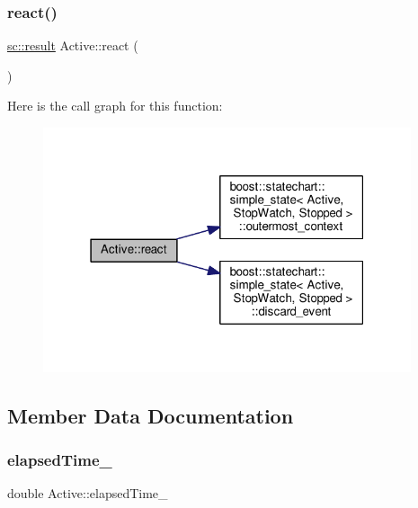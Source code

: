 \subsubsection{\texorpdfstring{react()}{react()}\hspace{0.1cm}{\footnotesize\ttfamily [2/2]}}
{\footnotesize\ttfamily \mbox{\hyperlink{namespaceboost_1_1statechart_abe807f6598b614d6d87bb951ecd92331}{sc\+::result}} Active\+::react (\begin{DoxyParamCaption}\item[{const \mbox{\hyperlink{struct_ev_leaf_deferred}{Ev\+Leaf\+Deferred}} \&}]{ }\end{DoxyParamCaption})\hspace{0.3cm}{\ttfamily [inline]}}

Here is the call graph for this function\+:
\nopagebreak
\begin{figure}[H]
\begin{center}
\leavevmode
\includegraphics[width=307pt]{struct_active_a173c792f4e486c497ad10ebc5add135e_cgraph}
\end{center}
\end{figure}


\subsection{Member Data Documentation}
\mbox{\label{struct_active_a3f50dfab6f5983a20aedd5a3cb6a49c9}} 
\subsubsection{\texorpdfstring{elapsed\+Time\+\_\+}{elapsedTime\_}}
{\footnotesize\ttfamily double Active\+::elapsed\+Time\+\_\+\hspace{0.3cm}{\ttfamily [private]}}



